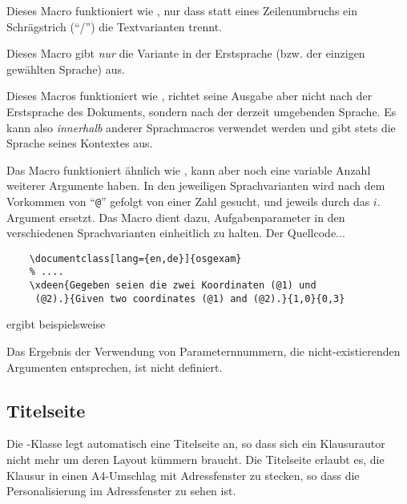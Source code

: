 \documentclass[
load=osgexam,
babel=ngerman
]{skdoc}
\begin{document}
\DescribeMacro{}Dieses Macro funktioniert wie
, nur dass statt eines Zeilenumbruchs ein Schrägstrich (``/'') die Textvarianten trennt.
\medskip

\DescribeMacro{}Dieses Macro gibt \emph{nur} die
Variante in der Erstsprache (bzw. der einzigen gewählten Sprache) aus.
\medskip

\DescribeMacro{}Dieses Macros funktioniert wie
, richtet seine Ausgabe aber nicht nach der Erstsprache des Dokuments, sondern nach der derzeit umgebenden
Sprache. Es kann also \emph{innerhalb} anderer Sprachmacros verwendet werden und gibt stets die Sprache seines Kontextes
aus.
\medskip

\DescribeMacro{} %
  Das Macro  funktioniert ähnlich wie , kann aber noch eine variable Anzahl weiterer Argumente
  haben. In den jeweiligen Sprachvarianten wird nach dem Vorkommen von ``\verb!@!'' gefolgt von einer Zahl 
  gesucht, und jeweils durch das $i$. Argument ersetzt. Das Macro dient dazu, Aufgabenparameter in den verschiedenen
  Sprachvarianten einheitlich zu halten.
  Der Quellcode...
  \begin{lstlisting}
    \documentclass[lang={en,de}]{osgexam}
    % ....
    \xdeen{Gegeben seien die zwei Koordinaten (@1) und
     (@2).}{Given two coordinates (@1) and (@2).}{1,0}{0,3}
  \end{lstlisting}
\noindent  ergibt beispielsweise

\noindent{}
\medskip

Das Ergebnis der Verwendung von Parameternnummern, die nicht-existierenden Argumenten entsprechen, ist nicht definiert.
\subsection{Titelseite}
\label{sec:macro:title}
Die \thepkg-Klasse legt automatisch eine Titelseite an, so dass sich ein Klausurautor nicht mehr um deren Layout kümmern
braucht.
Die Titelseite erlaubt es, die Klausur in einen A4-Umschlag mit Adressfenster zu stecken, so dass die Personalisierung im
Adressfenster zu sehen ist.
\end{document}
